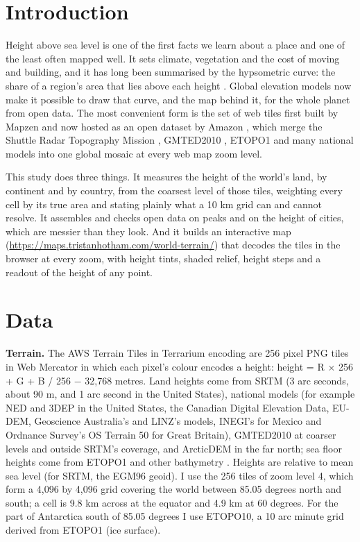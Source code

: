 \documentclass[11pt,a4paper]{article}
\begin{document}
\section{Introduction}
Height above sea level is one of the first facts we learn about a place and one of the least often mapped well. It sets climate, vegetation and the cost of moving and building, and it has long been summarised by the hypsometric curve: the share of a region's area that lies above each height \citep{strahler}. Global elevation models now make it possible to draw that curve, and the map behind it, for the whole planet from open data. The most convenient form is the set of web tiles first built by Mapzen and now hosted as an open dataset by Amazon \citep{terraintiles}, which merge the Shuttle Radar Topography Mission \citep{srtm}, GMTED2010 \citep{gmted}, ETOPO1 \citep{etopo1} and many national models into one global mosaic at every web map zoom level.

This study does three things. It measures the height of the world's land, by continent and by country, from the coarsest level of those tiles, weighting every cell by its true area and stating plainly what a 10 km grid can and cannot resolve. It assembles and checks open data on peaks and on the height of cities, which are messier than they look. And it builds an interactive map (\url{https://maps.tristanhotham.com/world-terrain/}) that decodes the tiles in the browser at every zoom, with height tints, shaded relief, height steps and a readout of the height of any point.

\section{Data}
\textbf{Terrain.} The AWS Terrain Tiles in Terrarium encoding are 256 pixel PNG tiles in Web Mercator in which each pixel's colour encodes a height: height = R $\times$ 256 + G + B / 256 $-$ 32,768 metres. Land heights come from SRTM (3 arc seconds, about 90 m, and 1 arc second in the United States), national models (for example NED and 3DEP in the United States, the Canadian Digital Elevation Data, EU-DEM, Geoscience Australia's and LINZ's models, INEGI's for Mexico and Ordnance Survey's OS Terrain 50 for Great Britain), GMTED2010 at coarser levels and outside SRTM's coverage, and ArcticDEM in the far north; sea floor heights come from ETOPO1 and other bathymetry \citep{joerd}. Heights are relative to mean sea level (for SRTM, the EGM96 geoid). I use the 256 tiles of zoom level 4, which form a 4,096 by 4,096 grid covering the world between 85.05 degrees north and south; a cell is 9.8 km across at the equator and 4.9 km at 60 degrees. For the part of Antarctica south of 85.05 degrees I use ETOPO10, a 10 arc minute grid derived from ETOPO1 (ice surface).
\end{document}
